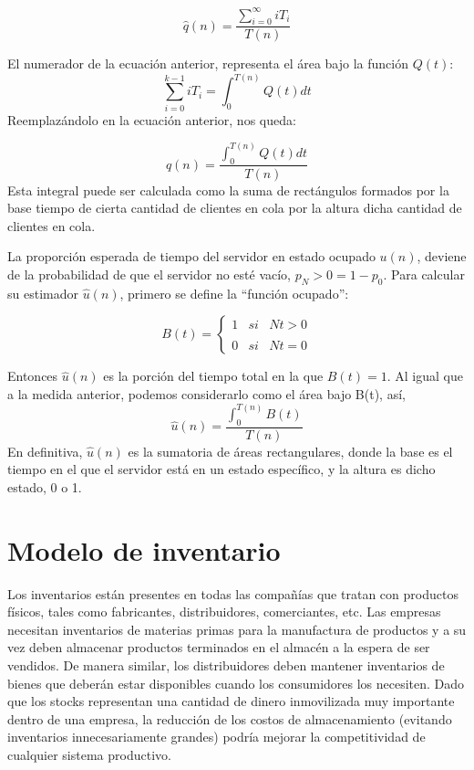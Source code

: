 \begin{equation}
  \label{eq:equation4}
\hat{q}(n)=\frac{\sum_{i=0}^{\infty}iT_{i} }{T(n)}
\end{equation}

El numerador de la ecuación anterior, representa el área bajo la función $Q(t)$:
\begin{equation}
  \label{eq:equation5}
  \sum_{i=0}^{k-1}iT_{i} = \int_{0}^{T(n)}Q(t)dt
\end{equation}
Reemplazándolo en la ecuación anterior, nos queda:

\begin{equation}
  \label{eq:equation6}
  \hat{q}(n)=\frac{\int_{0}^{T(n)}Q(t)dt }{T(n)}
\end{equation}
Esta integral puede ser calculada como la suma de rectángulos formados por la base tiempo de cierta cantidad
de clientes en cola por la altura dicha cantidad de clientes en cola.

La proporción esperada de tiempo del servidor en estado ocupado $u(n)$, deviene de la probabilidad de que
el servidor no esté vacío, $p_{N} > 0 = 1 - p_{0}$. Para calcular su estimador $\hat{u}(n)$, primero se define la ``función
ocupado'':

\begin{equation}\label{eq:equation7}
  B(t) = \left\{ \begin{array}{lcc}
                  1 &   si  & Nt>0  \\
                  \\ 0 &  si  & Nt=0
  \end{array}
  \right.
\end{equation}

Entonces $\hat{u}(n)$ es la porción del tiempo total en la que $B(t) = 1$.
Al igual que a la medida anterior, podemos considerarlo como el área bajo B(t), así,
\begin{equation}\label{eq:equation8}
\hat{u}(n)=\frac{\int_{0}^{T(n)}B(t)}{T(n)}
\end{equation}
En definitiva, $\hat{u}(n)$ es la sumatoria de áreas rectangulares, donde la base es el tiempo en el que el servidor
está en un estado específico, y la altura es dicho estado, 0 o 1.

\section{Modelo de inventario}\label{sec:modelo-m/m/c}
Los inventarios están presentes en todas las compañías que tratan con productos físicos,
tales como fabricantes, distribuidores, comerciantes, etc.
Las empresas necesitan inventarios de materias primas para la manufactura de productos y a su vez
deben almacenar productos terminados en el almacén a la espera de ser vendidos.
De manera similar, los distribuidores deben mantener inventarios de bienes que deberán estar
disponibles cuando los consumidores los necesiten.
Dado que los stocks representan una cantidad de dinero inmovilizada muy importante dentro
de una empresa, la reducción de los costos de almacenamiento (evitando inventarios
innecesariamente grandes) podría mejorar la competitividad de cualquier sistema
productivo.

